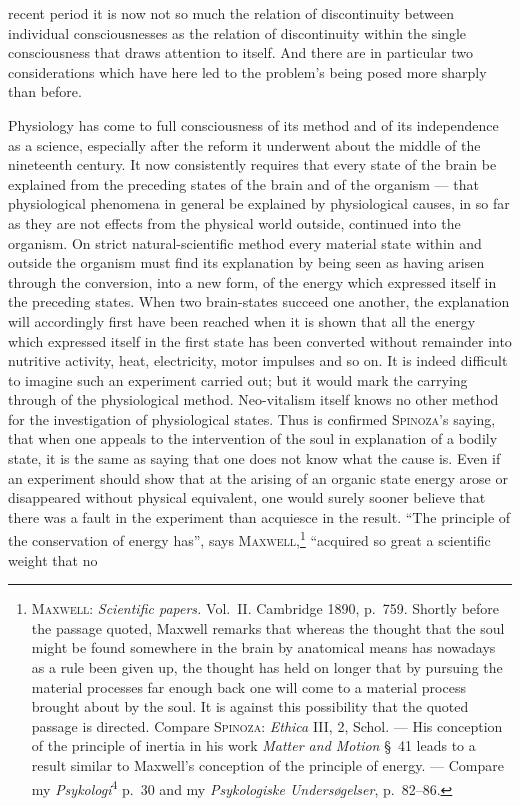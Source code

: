 \documentclass[12pt,a4paper]{book}
\newcommand{\opage}[1]{\marginnote{\footnotesize\textit{[#1]}}}
\begin{document}
recent period it is now not so much the relation of discontinuity between
individual consciousnesses as the relation of discontinuity within the single
consciousness that draws attention to itself. And there are in particular two
considerations which have here led to the problem's being posed more sharply
than before.

Physiology has come to full consciousness of its method and of its independence
as a science, especially after the reform it underwent about the middle of the
nineteenth century. It now consistently requires that every state of the brain
be explained from the preceding states of the brain and of the organism ---
that physiological phenomena in general be explained by physiological causes, in
so far as they are not effects from the physical world outside, continued into
the organism. On strict natural-scientific method every material state within
and outside the organism must find its explanation by being seen as having
arisen through the conversion, into a new form, of the energy which expressed
itself \opage{14}in the preceding states. When two brain-states succeed one another, the
explanation will accordingly first have been reached when it is shown that all
the energy which expressed itself in the first state has been converted without
remainder into nutritive activity, heat, electricity, motor impulses and so on.
It is indeed difficult to imagine such an experiment carried out; but it would
mark the carrying through of the physiological method. Neo-vitalism itself knows
no other method for the investigation of physiological states. Thus is confirmed
\textsc{Spinoza}'s saying, that when one appeals to the intervention of the soul
in explanation of a bodily state, it is the same as saying that one does not
know what the cause is. Even if an experiment should show that at the arising of
an organic state energy arose or disappeared without physical equivalent, one
would surely sooner believe that there was a fault in the experiment than
acquiesce in the result. ``The principle of the conservation of energy has'',
says \textsc{Maxwell},\footnote{\textsc{Maxwell}: \textit{Scientific papers.}
Vol.~II. Cambridge 1890, p.~759. Shortly before the passage quoted, Maxwell
remarks that whereas the thought that the soul might be found somewhere in the
brain by anatomical means has nowadays as a rule been given up, the thought has
held on longer that by pursuing the material processes far enough back one will
come to a material process brought about by the soul. It is against this
possibility that the quoted passage is directed. Compare \textsc{Spinoza}:
\textit{Ethica} III, 2, Schol. --- His conception of the principle of inertia in
his work \textit{Matter and Motion} §~41 leads to a result similar to Maxwell's
conception of the principle of energy. --- Compare my
\textit{Psykologi}\textsuperscript{4} p.~30 and my \textit{Psykologiske
Undersøgelser}, p.~82--86.} ``acquired so great a scientific weight that no
\end{document}

